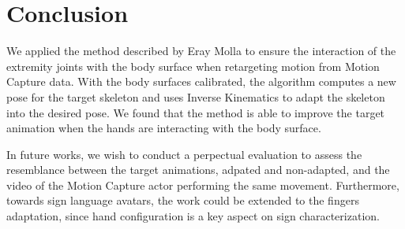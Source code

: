 \documentclass{vgtc}
\begin{document}
    \section{Conclusion}\label{conclusion}

We applied the method described by Eray Molla to ensure the interaction
of the extremity joints with the body surface when retargeting motion
from Motion Capture data. With the body surfaces calibrated, the
algorithm computes a new pose for the target skeleton and uses Inverse
Kinematics to adapt the skeleton into the desired pose. We found that
the method is able to improve the target animation when the hands are
interacting with the body surface.

In future works, we wish to conduct a perpectual evaluation to assess
the resemblance between the target animations, adpated and non-adapted,
and the video of the Motion Capture actor performing the same movement.
Furthermore, towards sign language avatars, the work could be extended
to the fingers adaptation, since hand configuration is a key aspect on
sign characterization.


    
    



    
    
\end{document}
